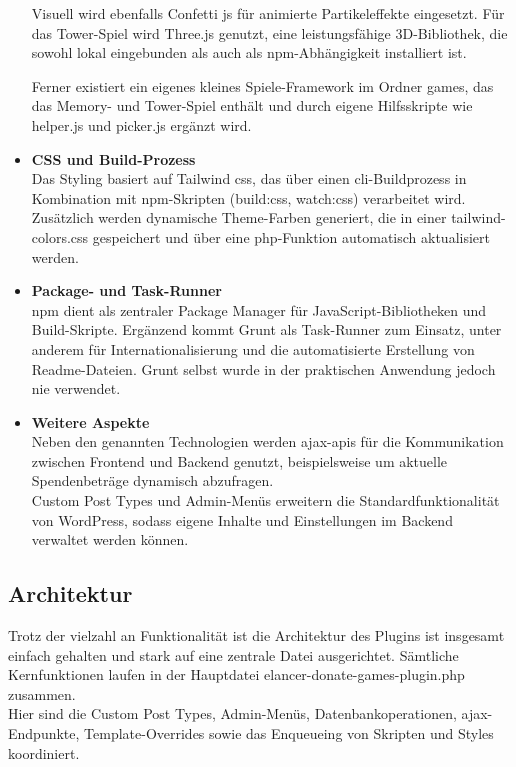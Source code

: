 \begin{itemize}
    Visuell wird ebenfalls Confetti \gls{js} für animierte Partikeleffekte eingesetzt.
    Für das Tower-Spiel wird Three.js genutzt, eine leistungsfähige 3D-Bibliothek, die sowohl lokal eingebunden als auch als \gls{npm}-Abhängigkeit installiert ist.

    Ferner existiert ein eigenes kleines Spiele-Framework im Ordner \grqq{}games\grqq{}, das das Memory- und Tower-Spiel enthält und durch eigene Hilfsskripte wie helper.js und picker.js ergänzt wird.

    \item \textbf{CSS und Build-Prozess}\\
    Das Styling basiert auf Tailwind \gls{css}, das über einen \gls{cli}-Buildprozess in Kombination mit npm-Skripten (build:css, watch:css) verarbeitet wird.
    Zusätzlich werden dynamische Theme-Farben generiert, die in einer tailwind-colors.css gespeichert und über eine \gls{php}-Funktion automatisch aktualisiert werden.

    \item \textbf{Package- und Task-Runner}\\
    \gls{npm} dient als zentraler Package Manager für JavaScript-Bibliotheken und Build-Skripte.
    Ergänzend kommt Grunt als Task-Runner zum Einsatz, unter anderem für Internationalisierung und die automatisierte Erstellung von Readme-Dateien.
    Grunt selbst wurde in der praktischen Anwendung jedoch nie verwendet.

    \item \textbf{Weitere Aspekte}\\
    Neben den genannten Technologien werden \gls{ajax}-\gls{api}s für die Kommunikation zwischen Frontend und Backend genutzt, beispielsweise um aktuelle Spendenbeträge dynamisch abzufragen.\\
    Custom Post Types und Admin-Menüs erweitern die Standardfunktionalität von WordPress, sodass eigene Inhalte und Einstellungen im Backend verwaltet werden können.
\end{itemize}
\subsection{Architektur}

Trotz der vielzahl an Funktionalität ist die Architektur des Plugins ist insgesamt einfach gehalten und stark auf eine zentrale Datei ausgerichtet.
Sämtliche Kernfunktionen laufen in der Hauptdatei elancer-donate-games-plugin.php zusammen.\\
Hier sind die Custom Post Types, Admin-Menüs, Datenbankoperationen, \gls{ajax}-Endpunkte, Template-Overrides sowie das Enqueueing von Skripten und Styles koordiniert.


